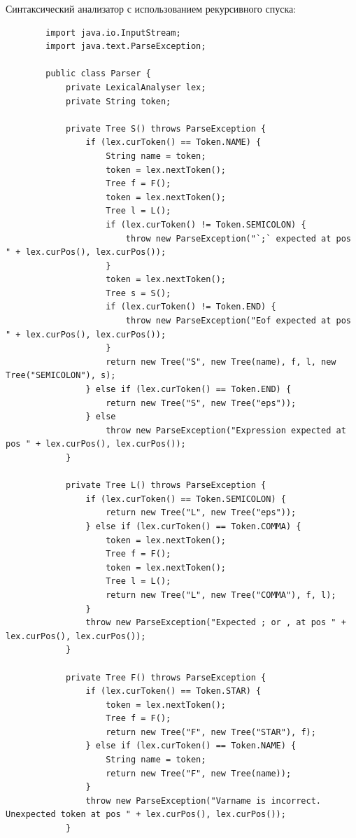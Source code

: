 \documentclass[10pt,a4paper,oneside]{article}
\begin{document}
  Синтаксический анализатор с использованием рекурсивного спуска:
  \begin{verbatim}
        import java.io.InputStream;
        import java.text.ParseException;
        
        public class Parser {
            private LexicalAnalyser lex;
            private String token;
        
            private Tree S() throws ParseException {
                if (lex.curToken() == Token.NAME) {
                    String name = token;
                    token = lex.nextToken();
                    Tree f = F();
                    token = lex.nextToken();
                    Tree l = L();
                    if (lex.curToken() != Token.SEMICOLON) {
                        throw new ParseException("`;` expected at pos " + lex.curPos(), lex.curPos());
                    }
                    token = lex.nextToken();
                    Tree s = S();
                    if (lex.curToken() != Token.END) {
                        throw new ParseException("Eof expected at pos " + lex.curPos(), lex.curPos());
                    }
                    return new Tree("S", new Tree(name), f, l, new Tree("SEMICOLON"), s);
                } else if (lex.curToken() == Token.END) {
                    return new Tree("S", new Tree("eps"));
                } else
                    throw new ParseException("Expression expected at pos " + lex.curPos(), lex.curPos());
            }
        
            private Tree L() throws ParseException {
                if (lex.curToken() == Token.SEMICOLON) {
                    return new Tree("L", new Tree("eps"));
                } else if (lex.curToken() == Token.COMMA) {
                    token = lex.nextToken();
                    Tree f = F();
                    token = lex.nextToken();
                    Tree l = L();
                    return new Tree("L", new Tree("COMMA"), f, l);
                }
                throw new ParseException("Expected ; or , at pos " + lex.curPos(), lex.curPos());
            }
        
            private Tree F() throws ParseException {
                if (lex.curToken() == Token.STAR) {
                    token = lex.nextToken();
                    Tree f = F();
                    return new Tree("F", new Tree("STAR"), f);
                } else if (lex.curToken() == Token.NAME) {
                    String name = token;
                    return new Tree("F", new Tree(name));
                }
                throw new ParseException("Varname is incorrect. Unexpected token at pos " + lex.curPos(), lex.curPos());
            }
        

\end{verbatim}
\end{document}
